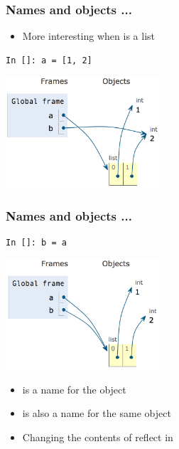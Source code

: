 \documentclass[14pt,compress,aspectratio=169]{beamer}
\begin{document}
\begin{frame}[fragile]
  \frametitle{Names and objects ...}
  \begin{itemize}
  \item More interesting when  is a list
  \end{itemize}
  \begin{minipage}{0.4\textwidth}
  \begin{lstlisting}
In []: a = [1, 2]
\end{lstlisting}
\end{minipage}
  \begin{minipage}{0.4\textwidth}
    \hspace*{0.2in}\includegraphics[width=2.25in]{data/a_list_b_2.png}
  \end{minipage}
\end{frame}

\begin{frame}[fragile]
  \frametitle{Names and objects ...}
  \begin{minipage}{0.4\textwidth}
  \begin{lstlisting}
In []: b = a
\end{lstlisting}
\end{minipage}
  \begin{minipage}{0.4\textwidth}
    \hspace*{0.2in}\includegraphics[width=2.25in]{data/a_b_list.png}
  \end{minipage}
  \pause
  \begin{itemize}
  \item {} is a name for the object \typ{[1, 2]}
  \item {} is also a name for the \alert{same object}
  \item Changing the contents of  reflect in 
  \end{itemize}
\end{frame}
\end{document}
